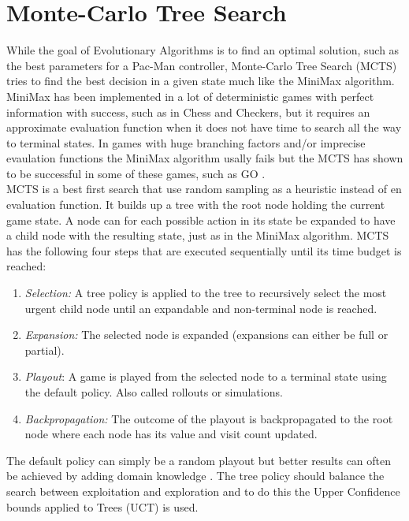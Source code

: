\documentclass[conference]{IEEEtran}
\begin{document}
\section{Monte-Carlo Tree Search}
While the goal of Evolutionary Algorithms is to find an optimal solution, such as the best parameters for a Pac-Man controller, Monte-Carlo Tree Search (MCTS) tries to find the best decision in a given state much like the MiniMax algorithm. MiniMax has been implemented in a lot of deterministic games with perfect information with success, such as in Chess and Checkers, but it requires an approximate evaluation function \cite{ShannonChess} when it does not have time to search all the way to terminal states. In games with huge branching factors and/or imprecise evaulation functions the MiniMax algorithm usally fails \cite{MCTSframework} but the MCTS has shown to be successful in some of these games, such as GO \cite{MCTSsurvey}.\\

MCTS is a best first search that use random sampling as a heuristic instead of en evaluation function. It builds up a tree with the root node holding the current game state. A node can for each possible action in its state be expanded to have a child node with the resulting state, just as in the MiniMax algorithm. MCTS has the following four steps that are executed sequentially until its time budget is reached:

\begin{enumerate}
  \item \emph{Selection:} A tree policy is applied to the tree to recursively select the most urgent child node until an expandable and non-terminal node is reached.
  \item \emph{Expansion:} The selected node is expanded (expansions can either be full or partial).
  \item \emph{Playout}: A game is played from the selected node to a terminal state using the default policy. Also called rollouts or simulations. 
  \item \emph{Backpropagation:} The outcome of the playout is backpropagated to the root node where each node has its value and visit count updated.
\end{enumerate}

The default policy can simply be a random playout but better results can often be achieved by adding domain knowledge \cite{MCTSsurvey}. The tree policy should balance the search between exploitation and exploration and to do this the Upper Confidence bounds applied to Trees (UCT) is used.
\end{document}
